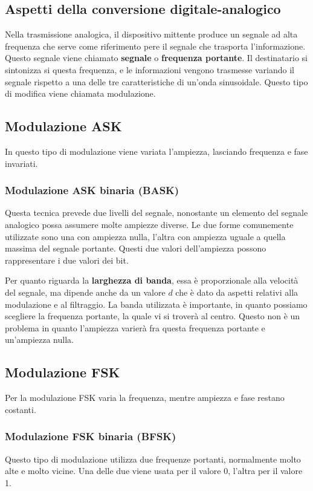     \subsection{Aspetti della conversione digitale-analogico}
        Nella trasmissione analogica, il dispositivo mittente produce un segnale ad alta frequenza che serve come riferimento pere il segnale che trasporta l'informazione. Questo segnale viene chiamato \textbf{segnale} o \textbf{frequenza portante}. Il destinatario si sintonizza si questa frequenza, e le informazioni vengono trasmesse variando il segnale rispetto a una delle tre caratteristiche di un'onda sinusoidale. Questo tipo di modifica viene chiamata modulazione.
        
    \subsection{Modulazione ASK}
        In questo tipo di modulazione viene variata l'ampiezza, lasciando frequenza e fase invariati.
        
        \subsubsection{Modulazione ASK binaria (BASK)}
            Questa tecnica prevede due livelli del segnale, nonostante un elemento del segnale analogico possa assumere molte ampiezze diverse. Le due forme comunemente utilizzate sono una con ampiezza nulla, l'altra con ampiezza uguale a quella massima del segnale portante. Questi due valori dell'ampiezza possono rappresentare i due valori dei bit.
            
            Per quanto riguarda la \textbf{larghezza di banda}, essa è proporzionale alla velocità del segnale, ma dipende anche da un valore $d$ che è dato da aspetti relativi alla modulazione e al filtraggio. La banda utilizzata è importante, in quanto possiamo scegliere la frequenza portante, la quale vi si troverà al centro. Questo non è un problema in quanto l'ampiezza varierà fra questa frequenza portante e un'ampiezza nulla.
            
    \subsection{Modulazione FSK}
        Per la modulazione FSK varia la frequenza, mentre ampiezza e fase restano costanti.
        
        \subsubsection{Modulazione FSK binaria (BFSK)}
            Questo tipo di modulazione utilizza due frequenze portanti, normalmente molto alte e molto vicine. Una delle due viene usata per il valore 0, l'altra per il valore 1.
            
